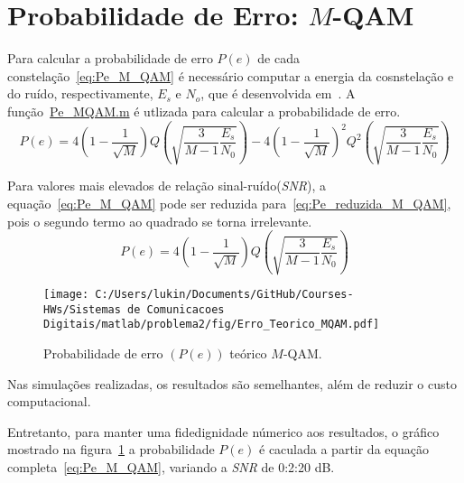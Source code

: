 \section{Probabilidade de Erro: \texorpdfstring{$M$}{M}-QAM}
Para calcular a probabilidade de erro $P(e)$ de cada constelação~\ref{eq:Pe_M_QAM} é necessário computar a energia da cosnstelação e do ruído, respectivamente, $E_s$ e $N_o$, que é desenvolvida em~\cite{Cecilio}. A função~\href{https://raw.githubusercontent.com/lucasabdalah/Courses-HWs/SCD/Sistemas%20de%20Comunicacoes%20Digitais/matlab/problema2/Pe_MQAM.m}{\colorbox{gray!20}{\color{red}Pe\_MQAM.m}} é utlizada para calcular a probabilidade de erro.
\begin{equation}
    P(e) = 4 \left(1-\frac{1}{\sqrt{M}}\right) Q\left(\sqrt{\frac{3}{M-1}\frac{E_s}{N_0}}\right) - 4\left(1-\frac{1}{\sqrt{M}}\right)^2 Q^2\left(\sqrt{\frac{3}{M-1}\frac{E_s}{N_0}}\right)
    \label{eq:Pe_M_QAM}
\end{equation}

Para valores mais elevados de relação sinal-ruído(\textit{SNR}), a equação~\ref{eq:Pe_M_QAM} pode ser reduzida para~\ref{eq:Pe_reduzida_M_QAM}, pois o segundo termo ao quadrado se torna irrelevante.
\begin{equation}
    P(e) = 4 \left(1-\frac{1}{\sqrt{M}}\right) Q\left(\sqrt{\frac{3}{M-1}\frac{E_s}{N_0}}\right)
    \label{eq:Pe_reduzida_M_QAM}
\end{equation}

\begin{figure}[!ht]
    \centering
    \texttt{[image: C:/Users/lukin/Documents/GitHub/Courses-HWs/Sistemas de Comunicacoes Digitais/matlab/problema2/fig/Erro\_Teorico\_MQAM.pdf]}
    \caption{Probabilidade de erro $(P(e))$ teórico $M$-QAM.}
    \label{fig:Erro_Teorico_MQAM}
\end{figure}

Nas simulações realizadas, os resultados são semelhantes, além de reduzir o custo computacional.

Entretanto, para manter uma fidedignidade númerico aos resultados, o gráfico mostrado na figura~\ref{fig:Erro_Teorico_MQAM} a probabilidade $P(e)$ é caculada a partir da equação completa~\ref{eq:Pe_M_QAM}, variando a \textit{SNR} de 0:2:20 dB.